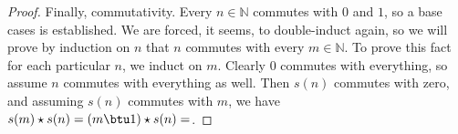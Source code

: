 \begin{proof}
    Finally, commutativity. Every $n \in \mathbb{N}$ commutes with $0$ and $1$, so a base cases is established. We are forced, it seems, to double-induct again, so we will prove by induction on $n$ that $n$ commutes with every $m \in \mathbb{N}$. To prove this fact for each particular $n$, we induct on $m$. Clearly $0$ commutes with everything, so assume $n$ commutes with everything as well. Then $s(n)$ commutes with zero, and assuming $s(n)$ commutes with $m$, we have $s(m) \star s(n) = (m \btu 1) \star s(n) = $.

\end{proof}


